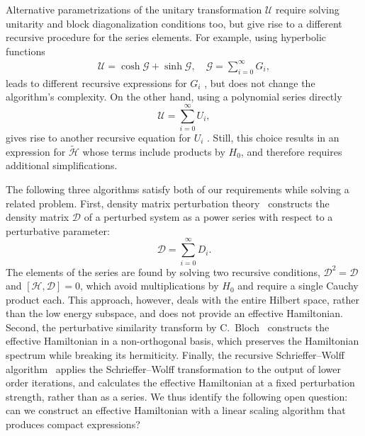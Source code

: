 Alternative parametrizations of the unitary transformation $\mathcal{U}$
require solving unitarity and block diagonalization conditions too, but
give rise to a different recursive procedure for the series elements.
For example, using hyperbolic functions
%
\begin{gather}
\mathcal{U} = \cosh{\mathcal{G}} + \sinh{\mathcal{G}}, \quad
\mathcal{G} = \sum_{i=0}^{\infty} G_i,
\end{gather}
%
leads to different recursive expressions for $G_i$ \cite{Shavitt_1980},
but does not change the algorithm's complexity.
On the other hand, using a polynomial series directly
%
\begin{equation}
\mathcal{U} = \sum_{i=0}^{\infty} U_i,
\end{equation}
%
gives rise to another recursive equation for $U_i$
\cite{Van_Vleck_1929, Lowdin_1962, Klein_1974, Suzuki_1983}.
Still, this choice results in an expression for $\tilde{\mathcal{H}}$ whose
terms include products by $H_0$, and therefore requires additional
simplifications.

The following three algorithms satisfy both of our requirements while solving
a related problem.
First, density matrix perturbation
theory~\cite{McWeeny_1962,McWeeny_1968,Truflandier_2020} constructs the density
matrix $\mathcal{D}$ of a perturbed system as a power series with respect to a
perturbative parameter:
%
\begin{equation}
  \mathcal{D} = \sum_{i=0}^{\infty} D_i.
\end{equation}
%
The elements of the series are found by solving two recursive conditions,
$\mathcal{D}^2 = \mathcal{D}$ and $[\mathcal{H}, \mathcal{D}]=0$, which avoid
multiplications by $H_0$ and require a single Cauchy product each.
This approach, however, deals with the entire Hilbert space, rather than the
low energy subspace, and does not provide an effective Hamiltonian.
Second, the perturbative similarity transform by C.~Bloch~\cite{Bloch_1958,Bravyi_2011}
constructs the effective Hamiltonian in a non-orthogonal basis, which preserves
the Hamiltonian spectrum while breaking its hermiticity.
Finally, the recursive Schrieffer--Wolff algorithm~\cite{Li_2022} applies the
Schrieffer--Wolff transformation to the output of lower order iterations, and
calculates the effective Hamiltonian at a fixed perturbation strength, rather
than as a series.
We thus identify the following open question: can we construct an effective
Hamiltonian with a linear scaling algorithm that produces compact expressions?

